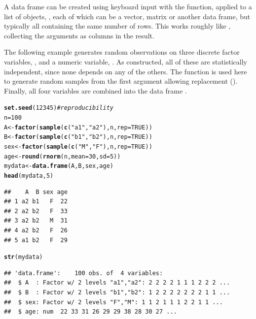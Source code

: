 \documentclass[11pt]{book}\usepackage[]{graphicx}\usepackage[]{color}
\makeatletter
\newcommand{\hlnum}[1]{\textcolor[rgb]{0.686,0.059,0.569}{#1}}%
\newcommand{\hlstr}[1]{\textcolor[rgb]{0.192,0.494,0.8}{#1}}%
\newcommand{\hlcom}[1]{\textcolor[rgb]{0.678,0.584,0.686}{\textit{#1}}}%
\newcommand{\hlstd}[1]{\textcolor[rgb]{0.345,0.345,0.345}{#1}}%
\newcommand{\hlkwb}[1]{\textcolor[rgb]{0.69,0.353,0.396}{#1}}%
\newcommand{\hlkwc}[1]{\textcolor[rgb]{0.333,0.667,0.333}{#1}}%
\newcommand{\hlkwd}[1]{\textcolor[rgb]{0.737,0.353,0.396}{\textbf{#1}}}%
\newenvironment{kframe}{%
 \def\at@end@of@kframe{}%
 \ifinner\ifhmode%
  \def\at@end@of@kframe{\end{minipage}}%
  \begin{minipage}{\columnwidth}%
 \fi\fi%
 \def\FrameCommand##1{\hskip\@totalleftmargin \hskip-\fboxsep
 \colorbox{shadecolor}{##1}\hskip-\fboxsep
     \hskip-\linewidth \hskip-\@totalleftmargin \hskip\columnwidth}%
 \MakeFramed {\advance\hsize-\width
   \@totalleftmargin\z@ \linewidth\hsize
   \@setminipage}}%
 {\par\unskip\endMakeFramed%
 \at@end@of@kframe}
\newenvironment{knitrout}{}{} %
\renewenvironment{knitrout}{\small\renewcommand{\baselinestretch}{.85}}{} %
\makeatother
\begin{document}
A data frame can be created using keyboard input 
with the  function, applied to a list of objects,
, each of which can be a vector, matrix or another
data frame, but typically all containing the same number of rows.
This works roughly like , collecting the arguments as columns
in the result.

The following example generates  random observations on 
three discrete factor variables, , and a numeric
variable, .  As constructed, all of these are 
statistically independent, since none depends on any of the others.
The function 
is used here to generate  random samples from the
first argument allowing replacement ().
Finally, all four variables are combined into the data frame
.


\begin{knitrout}
\color{fgcolor}\begin{kframe}
\begin{alltt}
\hlkwd{set.seed}\hlstd{(}\hlnum{12345}\hlstd{)}   \hlcom{# reproducibility}
\hlstd{n}\hlkwb{=}\hlnum{100}
\hlstd{A} \hlkwb{<-} \hlkwd{factor}\hlstd{(}\hlkwd{sample}\hlstd{(}\hlkwd{c}\hlstd{(}\hlstr{"a1"}\hlstd{,}\hlstr{"a2"}\hlstd{), n,} \hlkwc{rep}\hlstd{=}\hlnum{TRUE}\hlstd{))}
\hlstd{B} \hlkwb{<-} \hlkwd{factor}\hlstd{(}\hlkwd{sample}\hlstd{(}\hlkwd{c}\hlstd{(}\hlstr{"b1"}\hlstd{,}\hlstr{"b2"}\hlstd{), n,} \hlkwc{rep}\hlstd{=}\hlnum{TRUE}\hlstd{))}
\hlstd{sex} \hlkwb{<-} \hlkwd{factor}\hlstd{(}\hlkwd{sample}\hlstd{(}\hlkwd{c}\hlstd{(}\hlstr{"M"}\hlstd{,} \hlstr{"F"}\hlstd{), n,} \hlkwc{rep}\hlstd{=}\hlnum{TRUE}\hlstd{))}
\hlstd{age} \hlkwb{<-} \hlkwd{round}\hlstd{(}\hlkwd{rnorm}\hlstd{(n,} \hlkwc{mean}\hlstd{=}\hlnum{30}\hlstd{,} \hlkwc{sd}\hlstd{=}\hlnum{5}\hlstd{))}
\hlstd{mydata} \hlkwb{<-} \hlkwd{data.frame}\hlstd{(A, B, sex, age)}
\hlkwd{head}\hlstd{(mydata,}\hlnum{5}\hlstd{)}
\end{alltt}
\begin{verbatim}
##    A  B sex age
## 1 a2 b1   F  22
## 2 a2 b2   F  33
## 3 a2 b2   M  31
## 4 a2 b2   F  26
## 5 a1 b2   F  29
\end{verbatim}
\begin{alltt}
\hlkwd{str}\hlstd{(mydata)}
\end{alltt}
\begin{verbatim}
## 'data.frame':	100 obs. of  4 variables:
##  $ A  : Factor w/ 2 levels "a1","a2": 2 2 2 2 1 1 1 2 2 2 ...
##  $ B  : Factor w/ 2 levels "b1","b2": 1 2 2 2 2 2 2 2 1 1 ...
##  $ sex: Factor w/ 2 levels "F","M": 1 1 2 1 1 1 2 2 1 1 ...
##  $ age: num  22 33 31 26 29 29 38 28 30 27 ...
\end{verbatim}
\end{kframe}
\end{knitrout}
\end{document}
